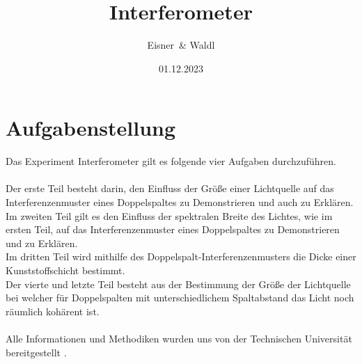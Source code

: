 \documentclass[12pt,a4paper,twoside]{article}
\begin{document}
\newcommand\laboratorynumber{2}
\title{Interferometer}
\newcommand\supervisor{Ditlbacher, Harald}
\newcommand\groupnumber{42}

\newcommand\participantonelastname{Eisner}
\newcommand\participantonefirstname{Nico}
\newcommand\participantoneid{12214121}
\newcommand\participanttwolastname{Waldl}
\newcommand\participanttwofirstname{Philip}
\newcommand\participanttwoid{12214120}
\author{\participantonelastname \ \& \participanttwolastname}

\newcommand\degreeid{UB 033 678}
\newcommand\semester{23WS}
\date{01.12.2023}

\newcommand\coursetitle{Laborübungen 2: \\ Elektrizität, Magnetismus, Optik}

%



\tableofcontents
\newpage

\section{Aufgabenstellung} %
Das Experiment Interferometer gilt es folgende vier Aufgaben durchzuführen. 
\\
\\
Der erste Teil besteht darin, den Einfluss der Größe einer Lichtquelle auf das Interferenzenmuster eines Doppelspaltes zu Demonstrieren und auch zu Erklären. 
\\
Im zweiten Teil gilt es den Einfluss der spektralen Breite des Lichtes, wie im ersten Teil, auf das Interferenzenmuster eines Doppelspaltes zu Demonstrieren und zu Erklären. 
\\
Im dritten Teil wird mithilfe des Doppelspalt-Interferenzenmusters die Dicke einer Kunststoffschicht bestimmt. 
\\
Der vierte und letzte Teil besteht aus der Bestimmung der Größe der Lichtquelle bei welcher für Doppelspalten mit unterschiedlichem Spaltabstand das Licht noch räumlich kohärent ist. 
\\
\\
Alle Informationen und Methodiken wurden uns von der Technischen Universität bereitgestellt \cite{teachcenter2}. 
\end{document}
